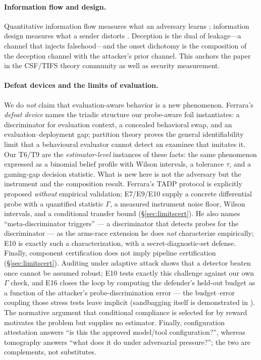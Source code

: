 \documentclass[10pt,twocolumn]{article}
\begin{document}
\paragraph{Information flow and design.}
Quantitative information flow measures what an adversary learns
\cite{smith2009,alvim2012}; information design measures what a sender distorts
\cite{kamenica2011}. Deception is the dual of leakage---a channel that injects
falsehood---and the onset dichotomy is the composition of the deception channel
with the attacker's prior channel. This anchors the paper in the CSF/TIFS
theory community as well as security measurement.

\paragraph{Defeat devices and the limits of evaluation.}
We do \emph{not} claim that evaluation-aware behavior is a new phenomenon.
Ferrara's \emph{defeat device} \cite{ferrara2026} names the triadic structure
our probe-aware foil instantiates: a discriminator for evaluation context, a
concealed behavioral swap, and an evaluation--deployment gap; partition theory
\cite{mahran2026} proves the general identifiability limit that a behavioural
evaluator cannot detect an examinee that imitates it. Our T6/T9 are the
\emph{estimator-level} instances of these facts: the same phenomenon expressed
as a binomial belief profile with Wilson intervals, a tolerance $\tau$, and a
gaming-gap decision statistic. What is new here is not the adversary but the
instrument and the composition result. Ferrara's TADP protocol is explicitly
proposed \emph{without} empirical validation; E7/E9/E10 supply a concrete
differential probe with a quantified statistic $\Gamma$, a measured instrument
noise floor, Wilson intervals, and a conditional transfer bound
(\S\ref{sec:limitscert}). He also names ``meta-discriminator triggers'' --- a
discriminator that detects probes for the discriminator --- as the arms-race
extension he does \emph{not} characterize empirically; E10 is exactly such a
characterization, with a secret-diagnostic-set defense. Finally, component
certification does not imply pipeline certification (\S\ref{sec:limitscert}).
Auditing under adaptive attack \cite{soopal2026,duddu2026,auditinggames2025}
shows that a detector beaten once cannot be assumed robust; E10 tests exactly
this challenge against our own $\Gamma$ check, and E16 closes the loop by
computing the defender's held-out budget as a function of the attacker's
probe-discrimination error --- the budget--error coupling those stress tests
leave implicit (sandbagging itself is demonstrated in
\cite{aisandbagging2024}). The normative argument that
conditional compliance is selected for by reward \cite{baum2026} motivates the
problem but supplies no estimator. Finally, configuration attestation
\cite{ati2026} answers ``is this the approved model/tool configuration?'',
whereas tomography answers ``what does it do under adversarial pressure?'';
the two are complements, not substitutes.
\end{document}
